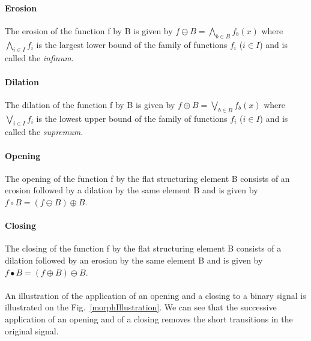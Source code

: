\documentclass[a4paper,12pt]{article}
\begin{document}
\paragraph{Erosion}
The erosion of the function f by B is given by $f \ominus B = \bigwedge\limits_{b \in B}f_b(x)$ where $\bigwedge\limits_{i \in I} f_i$ is the largest lower bound of the family of functions $f_i$ ($i \in I$) and is called the \textit{infinum}.

\paragraph{Dilation}
The dilation of the function f by B is given by $f \oplus B = \bigvee\limits_{b \in B}f_b(x)$ where $\bigvee\limits_{i \in I} f_i$ is the lowest upper bound of the family of functions $f_i$ ($i \in I$) and is called the \textit{supremum}.

\paragraph{Opening}
The opening of the function f by the flat structuring element B consists of an erosion followed by a dilation by the same element B and is given by $f \circ B = (f \ominus B) \oplus B$.

\paragraph{Closing}
The closing of the function f by the flat structuring element B consists of a dilation followed by an erosion by the same element B and is given by $f \bullet B = (f \oplus B) \ominus B$.

\paragraph{}
An illustration of the application of an opening and a closing to a binary signal is illustrated on the Fig.~\ref{morphIllustration}. We can see that the successive application of an opening and of a closing removes the short transitions in the original signal.
\end{document}
